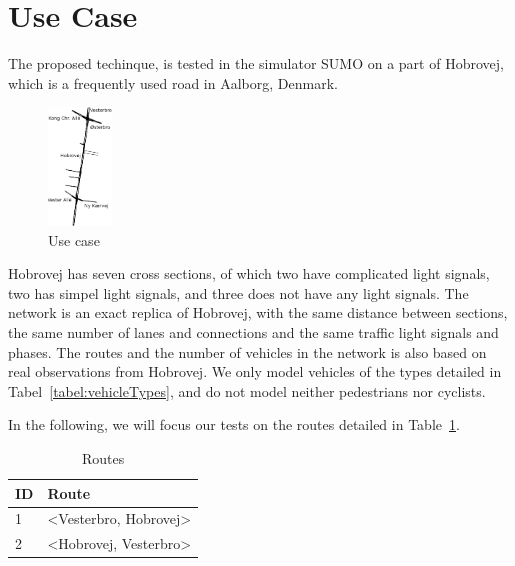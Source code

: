 \section{Use Case}
The proposed techinque, \tech is tested in the simulator SUMO on a part of Hobrovej, which is a frequently used road in Aalborg, Denmark.

\begin{figure}[htb]
\centering
\includegraphics[width=0.15\textwidth]{images/Hobrovej.png}
\caption{Use case}
\label{fig:Introduction:hobro}
\end{figure}

Hobrovej has seven cross sections, of which two have complicated light signals, two has simpel light signals, and three does not have any light signals. %
The network is an exact replica of Hobrovej, with the same distance between sections, the same number of lanes and connections and the same traffic light signals and phases.
The routes and the number of vehicles in the network is also based on real observations from Hobrovej.
We only model vehicles of the types detailed in Tabel~\ref{tabel:vehicleTypes}, and do not model neither pedestrians nor cyclists.

In the following, we will focus our tests on the routes detailed in Table~\ref{tb:useCase:routes}.
\begin{table} %
\centering
\begin{tabular}{|l|l|}\hline
\textbf{ID} & \textbf{Route}\\\hline
1 & <Vesterbro, Hobrovej>\\\hline
2 & <Hobrovej, Vesterbro>\\\hline
\end{tabular}
\caption{Routes}\label{tb:useCase:routes}
\end{table}